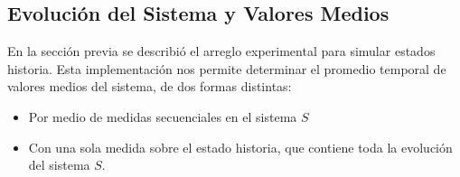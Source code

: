 
\subsection{\label{sec:Polarization measurement} %
Evolución del Sistema y Valores Medios}

%
En la sección previa se describió 
el arreglo experimental para simular estados historia. Esta implementación nos permite determinar el promedio temporal de valores medios del sistema, de dos formas distintas:
\begin{itemize}
    \item Por medio de medidas secuenciales en el sistema $S$
    \item Con una sola medida sobre el estado historia, que contiene toda la evolución del sistema $S$. 
\end{itemize}

